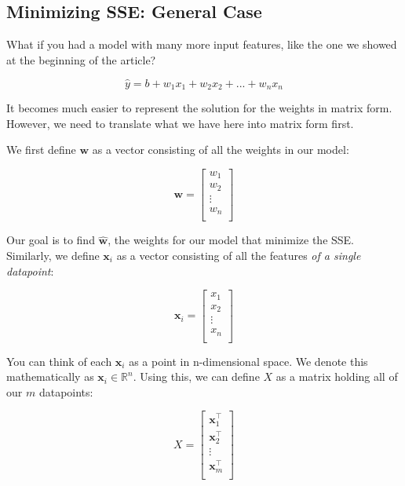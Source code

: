 \subsection{Minimizing SSE: General Case}
\begin{flushleft}
    \large What if you had a model with many more input features, like the one we showed at the beginning of the article?

    $$\hat{y} = b + w_1x_1 + w_2x_2 + ... + w_nx_n$$

    It becomes much easier to represent the solution for the weights in matrix form. However, we need to translate what we have here into matrix form first. \break 
    
    We first define $\textbf{w}$ as a vector consisting of all the weights in our model:

    $$\textbf{w} = \begin{bmatrix}
            w_1\\
            w_2\\
            \vdots\\
            w_n\\
            \end{bmatrix}$$

    Our goal is to find $\hat{\textbf{w}}$, the weights for our model that minimize the SSE. Similarly, we define $\textbf{x}_i$ as a vector consisting of all the features \textit{of a single datapoint}:

    $$\textbf{x}_i = \begin{bmatrix}
            x_1\\
            x_2\\
            \vdots\\
            x_n\\
            \end{bmatrix}$$

    You can think of each $\textbf{x}_i$ as a point in n-dimensional space. We denote this mathematically as $\textbf{x}_i \in \mathbb{R}^n$. Using this, we can define $X$ as a matrix holding all of our $m$ datapoints:

    $$X = \begin{bmatrix}
            \textbf{x}_1^{\top}\\
            \textbf{x}_2^{\top}\\
            \vdots\\
            \textbf{x}_m^{\top}\\
            \end{bmatrix}$$


\end{flushleft}
